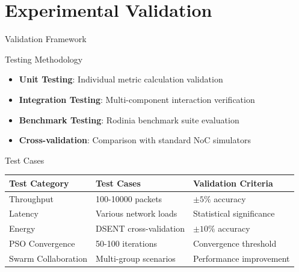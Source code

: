 \documentclass[10pt,aspectratio=169]{beamer}
\begin{document}
\section{Experimental Validation}

\begin{frame}{Validation Framework}
    \begin{block}{Testing Methodology}
        \begin{itemize}
            \item \textbf{Unit Testing}: Individual metric calculation validation
            \item \textbf{Integration Testing}: Multi-component interaction verification
            \item \textbf{Benchmark Testing}: Rodinia benchmark suite evaluation
            \item \textbf{Cross-validation}: Comparison with standard NoC simulators
        \end{itemize}
    \end{block}
    
    \begin{block}{Test Cases}
        \begin{center}
        \scriptsize
        \begin{tabular}{|l|l|l|}
            \hline
            \textbf{Test Category} & \textbf{Test Cases} & \textbf{Validation Criteria} \\
            \hline
            Throughput & 100-10000 packets & $\pm 5\%$ accuracy \\
            Latency & Various network loads & Statistical significance \\
            Energy & DSENT cross-validation & $\pm 10\%$ accuracy \\
            PSO Convergence & 50-100 iterations & Convergence threshold \\
            Swarm Collaboration & Multi-group scenarios & Performance improvement \\
            \hline
        \end{tabular}
        \end{center}
    \end{block}
\end{frame}
\end{document}
